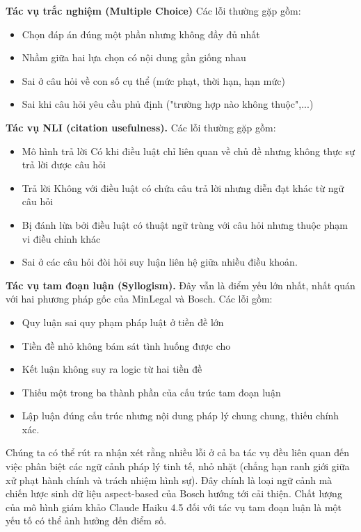 \textbf{Tác vụ trắc nghiệm (Multiple Choice)} Các lỗi thường gặp gồm: 
\begin{itemize}
    \item Chọn đáp án đúng một phần nhưng không đầy đủ nhất
    \item Nhầm giữa hai lựa chọn có nội dung gần giống nhau
    \item Sai ở câu hỏi về con số cụ thể (mức phạt, thời hạn, hạn mức)
    \item Sai khi câu hỏi yêu cầu phủ định ("trường hợp nào không thuộc",...)
\end{itemize}

\textbf{Tác vụ NLI (citation usefulness).} Các lỗi thường gặp gồm: 

\begin{itemize}
    \item Mô hình trả lời Có khi điều luật chỉ liên quan về chủ đề nhưng không thực sự trả lời được câu hỏi
    \item Trả lời Không với điều luật có chứa câu trả lời nhưng diễn đạt khác từ ngữ câu hỏi
    \item Bị đánh lừa bởi điều luật có thuật ngữ trùng với câu hỏi nhưng thuộc phạm vi điều chỉnh khác
    \item Sai ở các câu hỏi đòi hỏi suy luận liên hệ giữa nhiều điều khoản.
\end{itemize}

\textbf{Tác vụ tam đoạn luận (Syllogism).} Đây vẫn là điểm yếu lớn nhất, nhất quán với hai phương pháp gốc của MinLegal và Bosch. Các lỗi gồm:

\begin{itemize}
    \item Quy luận sai quy phạm pháp luật ở tiền đề lớn
    \item Tiền đề nhỏ không bám sát tình huống được cho
    \item Kết luận không suy ra logic từ hai tiền đề
    \item Thiếu một trong ba thành phần của cấu trúc tam đoạn luận
    \item Lập luận đúng cấu trúc nhưng nội dung pháp lý chung chung, thiếu chính xác.
\end{itemize}

Chúng ta có thể rút ra nhận xét rằng nhiều lỗi ở cả ba tác vụ đều liên quan đến việc phân biệt các ngữ cảnh pháp lý tinh tế, nhỏ nhặt (chẳng hạn ranh giới giữa xử phạt hành chính và trách nhiệm hình sự). Đây chính là loại ngữ cảnh mà chiến lược sinh dữ liệu aspect-based của Bosch hướng tới cải thiện. Chất lượng của mô hình giám khảo Claude Haiku 4.5 đối với tác vụ tam đoạn luận là một yếu tố có thể ảnh hưởng đến điểm số.
